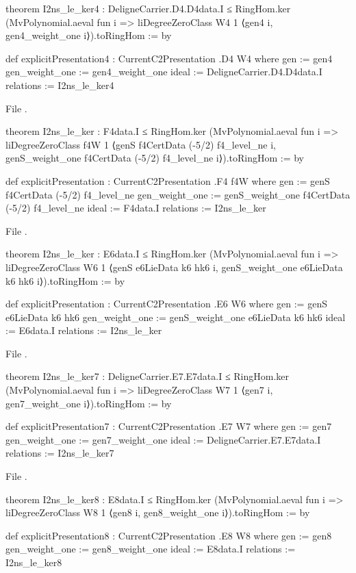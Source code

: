\begin{leancode}
theorem I2ns_le_ker4 : DeligneCarrier.D4.D4data.I ≤ RingHom.ker
    (MvPolynomial.aeval fun i => liDegreeZeroClass W4 1 ⟨gen4 i, gen4_weight_one i⟩).toRingHom := by

def explicitPresentation4 : CurrentC2Presentation .D4 W4 where
  gen := gen4
  gen_weight_one := gen4_weight_one
  ideal := DeligneCarrier.D4.D4data.I
  relations := I2ns_le_ker4
\end{leancode}
\noindent File .
\begin{leancode}
theorem I2ns_le_ker : F4data.I ≤ RingHom.ker
    (MvPolynomial.aeval fun i =>
      liDegreeZeroClass f4W 1 ⟨genS f4CertData (-5/2) f4_level_ne i,
        genS_weight_one f4CertData (-5/2) f4_level_ne i⟩).toRingHom := by

def explicitPresentation : CurrentC2Presentation .F4 f4W where
  gen := genS f4CertData (-5/2) f4_level_ne
  gen_weight_one := genS_weight_one f4CertData (-5/2) f4_level_ne
  ideal := F4data.I
  relations := I2ns_le_ker
\end{leancode}
\noindent File .
\begin{leancode}
theorem I2ns_le_ker : E6data.I ≤ RingHom.ker
    (MvPolynomial.aeval fun i =>
      liDegreeZeroClass W6 1 ⟨genS e6LieData k6 hk6 i, genS_weight_one e6LieData k6 hk6 i⟩).toRingHom := by

def explicitPresentation : CurrentC2Presentation .E6 W6 where
  gen := genS e6LieData k6 hk6
  gen_weight_one := genS_weight_one e6LieData k6 hk6
  ideal := E6data.I
  relations := I2ns_le_ker
\end{leancode}
\noindent File .
\begin{leancode}
theorem I2ns_le_ker7 : DeligneCarrier.E7.E7data.I ≤ RingHom.ker
    (MvPolynomial.aeval fun i => liDegreeZeroClass W7 1 ⟨gen7 i, gen7_weight_one i⟩).toRingHom := by

def explicitPresentation7 : CurrentC2Presentation .E7 W7 where
  gen := gen7
  gen_weight_one := gen7_weight_one
  ideal := DeligneCarrier.E7.E7data.I
  relations := I2ns_le_ker7
\end{leancode}
\noindent File .
\begin{leancode}
theorem I2ns_le_ker8 : E8data.I ≤ RingHom.ker
    (MvPolynomial.aeval fun i => liDegreeZeroClass W8 1 ⟨gen8 i, gen8_weight_one i⟩).toRingHom := by

def explicitPresentation8 : CurrentC2Presentation .E8 W8 where
  gen := gen8
  gen_weight_one := gen8_weight_one
  ideal := E8data.I
  relations := I2ns_le_ker8
\end{leancode}

